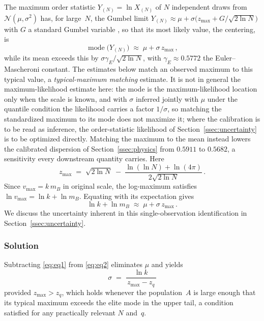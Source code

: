 \documentclass{article}
\begin{document}
The maximum order statistic $Y_{(N)} = \ln X_{(N)}$ of $N$ independent
draws from $\mathcal{N}(\mu,\sigma^2)$ has, for large~$N$, the Gumbel limit $Y_{(N)} \approx \mu + \sigma\big(z_{\max} + G/\sqrt{2\ln N}\big)$ with $G$ a standard Gumbel variable \cite{leadbetter1983,david2003}, so that its most likely value, the centering, is
\begin{equation}\label{eq:emax}
  \operatorname{mode}\big(Y_{(N)}\big)
  \;\approx\;
  \mu + \sigma\,z_{\max}\,,
\end{equation}
while its mean exceeds this by $\sigma\gamma_E/\sqrt{2\ln N}$, with $\gamma_E \approx 0.5772$ the Euler--Mascheroni constant. The estimates below match an observed maximum to this typical value, a \emph{typical-maximum matching} estimate. It is not in general the maximum-likelihood estimate here: the mode is the maximum-likelihood location only when the scale is known, and with $\sigma$ inferred jointly with $\mu$ under the quantile condition the likelihood carries a factor $1/\sigma$, so matching the standardized maximum to its mode does not maximize it; where the calibration is to be read as inference, the order-statistic likelihood of Section~\ref{ssec:uncertainty} is to be optimized directly. Matching the maximum to the mean instead lowers the calibrated dispersion of Section~\ref{ssec:physics} from $0.5911$ to $0.5682$, a sensitivity every downstream quantity carries. Here
\begin{equation}\label{eq:zmax}
  z_{\max}
  \;=\;
  \sqrt{2\ln N}
  \;-\;
  \frac{\ln(\ln N) + \ln(4\pi)}{2\sqrt{2\ln N}}\,.
\end{equation}
Since $v_{\max} = k\,m_B$ in original scale, the log-maximum satisfies
$\ln v_{\max} = \ln k + \ln m_B$. Equating with its expectation gives
\begin{equation}\label{eq:eq2}
  \ln k + \ln m_B
  \;\approx\;
  \mu + \sigma\,z_{\max}\,.
\end{equation}
We discuss the uncertainty inherent in this single-observation
identification in Section~\ref{ssec:uncertainty}.

\subsubsection{Solution}

Subtracting \eqref{eq:eq1} from \eqref{eq:eq2} eliminates $\mu$ and yields
\begin{equation}\label{eq:sigma-sol}
  \boxed{\;
    \sigma
    \;=\;
    \frac{\ln k}{\,z_{\max} - z_q\,}
  \;}
\end{equation}
provided $z_{\max} > z_q$, which holds whenever the population~$A$ is large
enough that its typical maximum exceeds the elite mode in the upper
tail, a condition satisfied for any practically relevant $N$ and~$q$.
\end{document}

